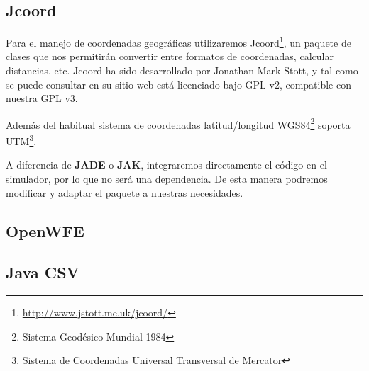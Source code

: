 
\subsection*{Jcoord}

Para el manejo de coordenadas geográficas utilizaremos
Jcoord\footnote{\url{http://www.jstott.me.uk/jcoord/}}, un paquete de clases que
nos permitirán convertir entre formatos de coordenadas, calcular distancias,
etc. Jcoord ha sido desarrollado por Jonathan Mark Stott, y tal como se puede
consultar en su sitio web está licenciado bajo GPL v2, compatible con nuestra
GPL v3. %

Además del habitual sistema de coordenadas latitud/longitud
WGS84\footnote{Sistema Geodésico Mundial 1984} soporta UTM\footnote{Sistema de
Coordenadas Universal Transversal de Mercator}.

A diferencia de {\bf JADE} o {\bf JAK}, integraremos directamente el código en
el simulador, por lo que no será una dependencia. De esta manera podremos
modificar y adaptar el paquete a nuestras necesidades.

\subsection*{OpenWFE}

\subsection*{Java CSV}